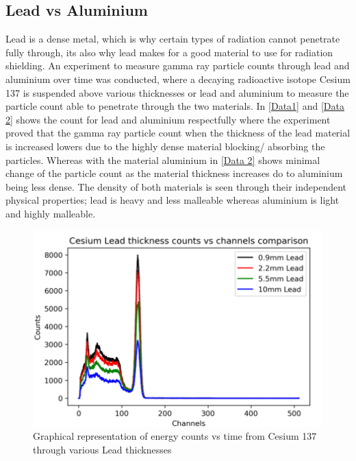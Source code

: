 \subsection{Lead vs Aluminium}
\label{Lead vs Aluminium SubSection}

Lead is a dense metal, which is why certain types of radiation cannot penetrate fully through, its also why lead makes for a good material to use for radiation shielding. An experiment \cite{GammaRay} to measure gamma ray particle counts through lead and aluminium over time was conducted, where a decaying radioactive isotope Cesium 137 is suspended above various thicknesses or lead and aluminium to measure the particle count able to penetrate through the two materials. In \cref{Data1} and \cref{Data 2} shows the count for lead and aluminium respectfully where the experiment proved that the gamma ray particle count when the thickness of the lead material is increased lowers due to the highly dense material blocking/ absorbing the particles. Whereas with the material aluminium in \cref{Data 2} shows minimal change of the particle count as the material thickness increases do to aluminium being less dense. The density of both materials is seen through their independent physical properties; lead is heavy and less malleable whereas aluminium is light and highly malleable. 

\newpage
\begin{figure}[H]
\centering
\includegraphics[scale=0.9]{Media/DataAnalysis/Screenshot 2021-03-15 at 05.49.36.png}
\caption{Graphical representation of energy counts vs time from Cesium 137 through various Lead thicknesses \cite{GammaRay}}
\label{Data 1}
\end{figure}

